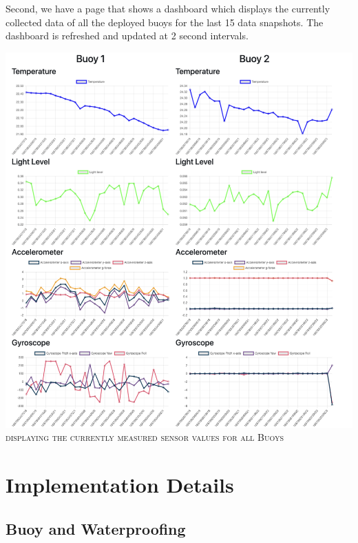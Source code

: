 \documentclass{article}
\begin{document}
\begin{multicols}{2}
\columnbreak
Second, we have a page that shows a dashboard which displays the currently collected data of all the deployed buoys for the last 15 data snapshots. The dashboard is refreshed and updated at 2 second intervals.
\begin{center}
    \includegraphics[width=\columnwidth]{report/images/alldata_pic.png}
    \textsc{displaying the currently measured sensor values for all Buoys}
\end{center}
   
\end{multicols}

\newpage
\section{Implementation Details}

\subsection{Buoy and Waterproofing}
\end{document}
